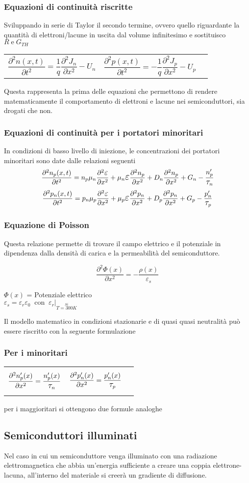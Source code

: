 \documentclass[12pt,a4paper]{article}
\makeatletter
\newcommand{\pdv}[3]{\frac{\partial^{#2} #1}{\partial #3^{#2}}}
\newcommand{\barSi}{\Big\lvert_{ \overset{Si}{T=300K}}}
\newcommand{\Tau}{ \mathlarger{\mathlarger{ \tau }}}
\newcommand{\Beps}{ \mathlarger{\mathlarger{ \varepsilon }}}
\newcommand{\eqlist}[4]{ 
	\subsubsection*{#1}
	\parbox{19cm}{#2}
	
	\begin{equation}
	#3
	\end{equation}
	\noindent\parbox{19cm}{#4}}
\newcommand{\deqlist}[5]{
	\subsubsection*{#1}
	
	\parbox{19cm}{#2}
	
	\noindent\begin{tabularx}{\textwidth}{@{}XXX@{}}
	\begin{equation}
	#3
	\end{equation}  & 
	\begin{equation}
	#4
	\end{equation}
	
	\end{tabularx}
	
	\noindent\parbox{19cm}{#5}}
\makeatother
\begin{document}
		\deqlist{Equazioni di continuità riscritte}
		{Sviluppando in serie di Taylor il secondo termine, ovvero quello riguardante la quantità di elettroni/lacune in uscita dal volume infinitesimo e sostituisco $ R \; \text{e} \; G_{TH}$}
		{\pdv{n(x,t)}{2}{t} = \frac{1}{q} \pdv{J_{n}}{2}{x} - U_{n}}
		{\pdv{p(x,t)}{2}{t} = - \frac{1}{q} \pdv{J_{p}}{2}{x} - U_{p}}
		{Questa rappresenta la prima delle equazioni che permettono di rendere matematicamente il comportamento di elettroni e lacune nei semiconduttori, sia drogati che non.} 
		
		
		\subsubsection*{Equazioni di continuità per i portatori minoritari}
		{In condizioni di basso livello di iniezione, le concentrazioni dei portatori minoritari sono date dalle relazioni seguenti }
		\begin{equation}
		\pdv{n_{p}(x,t)}{2}{t} = n_{p} \mu_{n}  \pdv{\Beps}{2}{x} + \mu_{n} \Beps \pdv{n_{p}}{2}{x} + D_{n} \pdv{n_{p}}{2}{x} + G_{n} -\frac{n_{p}'}{\Tau_{n}}
		\end{equation}
		\begin{equation}
		\pdv{p_{n}(x,t)}{2}{t} = p_{n} \mu_{p}  \pdv{\Beps}{2}{x} + \mu_{p} \Beps \pdv{p_{n}}{2}{x} + D_{p} \pdv{p_{n}}{2}{x} + G_{p} -\frac{p_{n}'}{\Tau_{p}}
		\end{equation}


		\eqlist{Equazione di Poisson}
		{Questa relazione permette di trovare il campo elettrico e il potenziale in dipendenza dalla densità di carica e la permeabilità del semiconduttore.}
		{\pdv{\Phi(x)}{2}{x} = -\frac{\rho(x)}{\varepsilon_{s}}}
		{$\Phi(x)$ = Potenziale elettrico \\ $\varepsilon_{s}=\varepsilon_{r} \varepsilon_{0} \; \; \text{con} \;\; \varepsilon_{r} \barSi $ }
	   
       Il modello matematico in condizioni stazionarie e di quasi quasi neutralità può essere riscritto con la seguente formulazione 
       \deqlist{Per i minoritari}{}
       {\pdv{n_{p}'(x)}{2}{x} = \frac{n_{p}'(x)}{\Tau_{n}}}
       {\pdv{p_{n}'(x)}{2}{x} = \frac{p_{n}'(x)}{\Tau_{p}}}
       {per i maggioritari si ottengono due formule analoghe}
	
	\subsection{Semiconduttori illuminati}
		Nel caso in cui un semiconduttore venga illuminato con una radiazione elettromagnetica che abbia un'energia sufficiente a creare una coppia elettrone-lacuna, all'interno del materiale si creerà un gradiente di diffusione.
\end{document}
